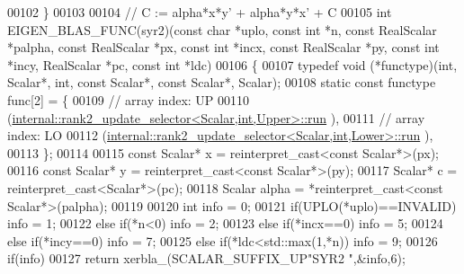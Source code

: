 \begin{DoxyCode}
00102 \}
00103 
00104 \textcolor{comment}{// C := alpha*x*y' + alpha*y*x' + C}
00105 \textcolor{keywordtype}{int} EIGEN\_BLAS\_FUNC(syr2)(\textcolor{keyword}{const} \textcolor{keywordtype}{char} *uplo, \textcolor{keyword}{const} \textcolor{keywordtype}{int} *n, \textcolor{keyword}{const} RealScalar *palpha, \textcolor{keyword}{const} RealScalar *px, \textcolor{keyword}{
      const} \textcolor{keywordtype}{int} *incx, \textcolor{keyword}{const} RealScalar *py, \textcolor{keyword}{const} \textcolor{keywordtype}{int} *incy, RealScalar *pc, \textcolor{keyword}{const} \textcolor{keywordtype}{int} *ldc)
00106 \{
00107   \textcolor{keyword}{typedef} void (*functype)(int, Scalar*, int, \textcolor{keyword}{const} Scalar*, \textcolor{keyword}{const} Scalar*, Scalar);
00108   \textcolor{keyword}{static} \textcolor{keyword}{const} functype func[2] = \{
00109     \textcolor{comment}{// array index: UP}
00110     (\hyperlink{structinternal_1_1rank2__update__selector}{internal::rank2\_update\_selector<Scalar,int,Upper>::run}
      ),
00111     \textcolor{comment}{// array index: LO}
00112     (\hyperlink{structinternal_1_1rank2__update__selector}{internal::rank2\_update\_selector<Scalar,int,Lower>::run}
      ),
00113   \};
00114 
00115   \textcolor{keyword}{const} Scalar* x = \textcolor{keyword}{reinterpret\_cast<}\textcolor{keyword}{const }Scalar*\textcolor{keyword}{>}(px);
00116   \textcolor{keyword}{const} Scalar* y = \textcolor{keyword}{reinterpret\_cast<}\textcolor{keyword}{const }Scalar*\textcolor{keyword}{>}(py);
00117   Scalar* c = \textcolor{keyword}{reinterpret\_cast<}Scalar*\textcolor{keyword}{>}(pc);
00118   Scalar alpha = *\textcolor{keyword}{reinterpret\_cast<}\textcolor{keyword}{const }Scalar*\textcolor{keyword}{>}(palpha);
00119 
00120   \textcolor{keywordtype}{int} info = 0;
00121   \textcolor{keywordflow}{if}(UPLO(*uplo)==INVALID)                                            info = 1;
00122   \textcolor{keywordflow}{else} \textcolor{keywordflow}{if}(*n<0)                                                       info = 2;
00123   \textcolor{keywordflow}{else} \textcolor{keywordflow}{if}(*incx==0)                                                   info = 5;
00124   \textcolor{keywordflow}{else} \textcolor{keywordflow}{if}(*incy==0)                                                   info = 7;
00125   \textcolor{keywordflow}{else} \textcolor{keywordflow}{if}(*ldc<std::max(1,*n))                                        info = 9;
00126   \textcolor{keywordflow}{if}(info)
00127     \textcolor{keywordflow}{return} xerbla\_(SCALAR\_SUFFIX\_UP\textcolor{stringliteral}{"SYR2 "},&info,6);

\end{DoxyCode}
